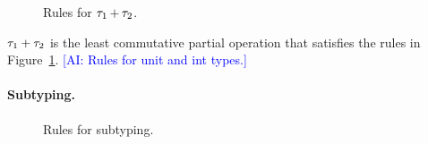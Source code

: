 \documentclass[runningheads]{llncs}
\newcommand{\AI}[1]{\textcolor{blue}{[AI: #1]\marginpar{$\longleftarrow$}}}
\begin{document}
\begin{figure}[t]
  \leavevmode

  \caption{Rules for $\tau_1 \operatorname{+} \tau_2$.}
  \label{fig:addition}
\end{figure}

\begin{definition}
  $\tau_1 + \tau_2$ is the least commutative partial operation that satisfies the rules in Figure~\ref{fig:addition}.
  \AI{Rules for unit and int types.}
\end{definition}

\paragraph{Subtyping.}

\begin{figure}[t]
\leavevmode
  \caption{Rules for subtyping.}
  \label{fig:subtyping}
\end{figure}
\end{document}
